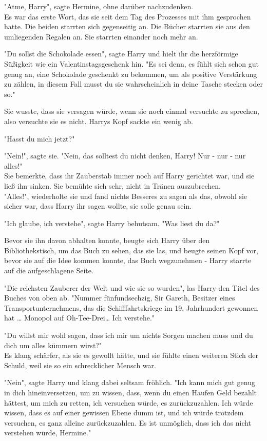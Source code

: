 {"Atme, Harry", sagte Hermine, ohne darüber nachzudenken.\\ Es war das erste Wort, das sie seit dem Tag des Prozesses mit ihm gesprochen hatte. Die beiden starrten sich gegenseitig an. Die Bücher starrten sie aus den umliegenden Regalen an. Sie starrten einander noch mehr an.

"Du sollst die Schokolade essen", sagte Harry und hielt ihr die herzförmige Süßigkeit wie ein Valentinstagsgeschenk hin. "Es sei denn, es fühlt sich schon gut genug an, eine Schokolade geschenkt zu bekommen, um als positive Verstärkung zu zählen, in diesem Fall musst du sie wahrscheinlich in deine Tasche stecken oder so."

Sie wusste, dass sie versagen würde, wenn sie noch einmal versuchte zu sprechen, also versuchte sie es nicht. Harrys Kopf sackte ein wenig ab.

"Hasst du mich jetzt?"

"Nein!", sagte sie. "Nein, das solltest du nicht denken, Harry! Nur - nur - nur alles!"\\ Sie bemerkte, dass ihr Zauberstab immer noch auf Harry gerichtet war, und sie ließ ihn sinken. Sie bemühte sich sehr, nicht in Tränen auszubrechen.\\ "Alles!", wiederholte sie und fand nichts Besseres zu sagen als das, obwohl sie sicher war, dass Harry ihr sagen wollte, sie solle genau sein.

"Ich glaube, ich verstehe", sagte Harry behutsam. "Was liest du da?"

Bevor sie ihn davon abhalten konnte, beugte sich Harry über den Bibliothekstisch, um das Buch zu sehen, das sie las, und beugte seinen Kopf vor, bevor sie auf die Idee kommen konnte, das Buch wegzunehmen - Harry starrte auf die aufgeschlagene Seite.

"Die reichsten Zauberer der Welt und wie sie so wurden", las Harry den Titel des Buches von oben ab. "Nummer fünfundsechzig, Sir Gareth, Besitzer eines Transportunternehmens, das die Schifffahrtskriege im 19. Jahrhundert gewonnen hat … Monopol auf Oh-Tee-Drei… Ich verstehe."

"Du willst mir wohl sagen, dass ich mir um nichts Sorgen machen muss und du dich um alles kümmern wirst?"\\ Es klang schärfer, als sie es gewollt hätte, und sie fühlte einen weiteren Stich der Schuld, weil sie so ein schrecklicher Mensch war.

"Nein", sagte Harry und klang dabei seltsam fröhlich. "Ich kann mich gut genug in dich hineinversetzen, um zu wissen, dass, wenn du einen Haufen Geld bezahlt hättest, um mich zu retten, ich versuchen würde, es zurückzuzahlen. Ich würde wissen, dass es auf einer gewissen Ebene dumm ist, und ich würde trotzdem versuchen, es ganz alleine zurückzuzahlen. Es ist unmöglich, dass ich das nicht verstehen würde, Hermine."

}
